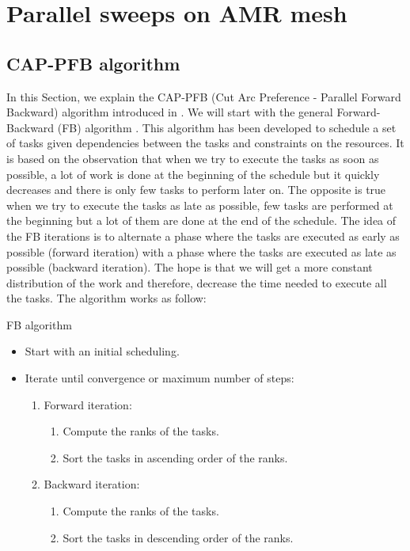 \documentclass[letterpaper]{article}
\renewcommand{\(}{\left(}
\renewcommand{\)}{\right)}
\renewcommand{\[}{\left[}
\renewcommand{\]}{\right]}
\begin{document}
\section{Parallel sweeps on AMR mesh} \label{parallel_sweeps}
\subsection{CAP-PFB algorithm}
In this Section, we explain the CAP-PFB (Cut Arc Preference - Parallel Forward
Backward) algorithm introduced in \cite{Mo2014}. We will start with the general
Forward-Backward (FB) algorithm \cite{Li1992}. This algorithm has been developed
to schedule a set of tasks given dependencies between the tasks and constraints
on the resources. It is based on the observation that when we try to execute the
tasks as soon as possible, a lot of work is done at the beginning of the
schedule but it quickly decreases and there is only few tasks to perform later
on. The opposite is true when we try to execute the tasks as late as possible,
few tasks are performed at the beginning but a lot of them are done at the end
of the schedule. The idea of the FB iterations is to alternate a phase where the
tasks are executed as early as possible (forward iteration) with a phase where
the tasks are executed as late as possible (backward iteration). The hope is
that we will get a more constant distribution of the work and therefore,
decrease the time needed to execute all the tasks. The algorithm works as
follow:
\begin{algorithm}[H]
  \caption{FB algorithm}
  \begin{itemize}
    \item Start with an initial scheduling.
    \item Iterate until convergence or maximum number of steps:
      \begin{enumerate}
        \item Forward iteration:
          \begin{enumerate}
            \item Compute the ranks of the tasks.
            \item Sort the tasks in ascending order of the ranks.
          \end{enumerate}
        \item Backward iteration:
          \begin{enumerate}
            \item Compute the ranks of the tasks.
            \item Sort the tasks in descending order of the ranks.
          \end{enumerate}
      \end{enumerate}
  \end{itemize}
\end{algorithm}
\end{document}
